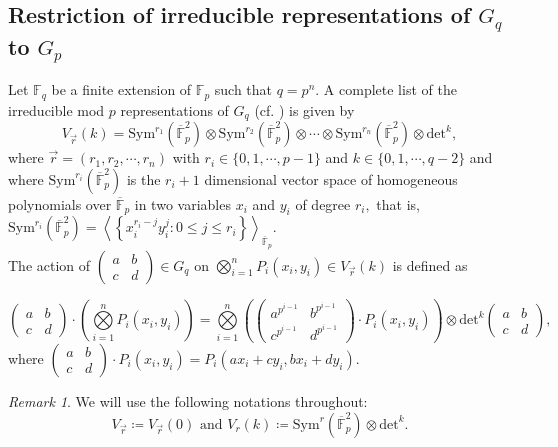 \documentclass[10pt, reqno]{amsart}
\def\F{{\mathbb F}}
\def\OF{{\overline{\mathbb F}}_p}
\def\OFs{{\overline{\mathbb F}}_p^2}
\def\Gq{{G_q}}
\def\Gp{{G_p}}
\numberwithin{equation}{section}
\theoremstyle{remark}
\newtheorem{remark}{Remark}
\begin{document}
            
    \subsection{Restriction of irreducible representations of $\Gq$ to $\Gp$}
    Let $\F_q$ be a finite extension of $\F_p$ such that $q=p^n.$
	A complete list of the irreducible mod $p$ representations of $\Gq$ (cf. \cite{BL}) is given by 
    $$V_{\vec{r}}(k)= \text{Sym}^{r_1}(\OFs)\otimes\text{Sym}^{r_2}(\OFs)\otimes\cdots\otimes\text{Sym}^{r_n}(\OFs)\otimes \mathrm{det}^k,$$
	where $\Vec{r}=(r_1,r_2,\cdots, r_n)$ with $r_i\in \{0,1,\cdots, p-1\}$ and $k\in\{0,1,\cdots, q-2\}$ and where $\text{Sym}^{r_i}(\OFs)$ is the $r_i+1$ dimensional vector space of homogeneous polynomials over $\OF$ in two variables $x_i$ and $y_i$ of degree $r_i,$ that is, $\text{Sym}^{r_i}(\OFs)=\left\langle\left\{x_i^{r_i-j}y_i^j: 0\leq j\leq r_i \right\} \right\rangle_{\OF}.$\\
    The action of $\left(
	\begin{matrix}
		a & b\\
		c & d
	\end{matrix}
	\right) \in\Gq$ on $\bigotimes\limits_{i=1}^n P_i(x_i,y_i)\in V_{\vec{r}}(k)$ is defined as 

				$$\left(
		\begin{matrix}
			a & b\\
			c & d
		\end{matrix}
		\right)\cdot \left(\bigotimes\limits_{i=1}^n P_i(x_i,y_i) \right)= \bigotimes\limits_{i=1}^n\left(\left(
		\begin{matrix}
			a^{p^{i-1}} & b^{p^{i-1}}\\
			c^{p^{i-1}} & d^{p^{i-1}}
		\end{matrix}
		\right)\cdot P_i(x_i,y_i)\right)\otimes \mathrm{det}^k\left(
		\begin{matrix}
			a & b\\
			c & d
		\end{matrix}
		\right),$$ where $\left(
	\begin{matrix}
		a & b\\
		c & d
	\end{matrix}
	\right)\cdot P_i(x_i,y_i)=P_i
    \left(ax_i+cy_i,bx_i+dy_i\right).$
    
\begin{remark}
    We will use the following notations throughout: $$V_{\vec{r}}\coloneqq V_{\vec{r}}(0)\text{ and }V_r(k)\coloneqq \text{Sym}^{r}(\OFs)\otimes\mathrm{det}^k.$$ 
\end{remark}
   
\end{document}
